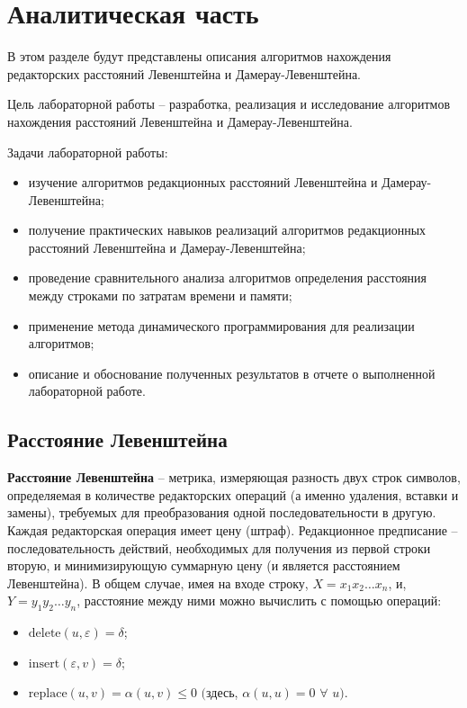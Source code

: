 \chapter{Аналитическая часть}

В этом разделе будут представлены описания алгоритмов нахождения редакторских расстояний Левенштейна и Дамерау-Левенштейна.

Цель лабораторной работы -- разработка, реализация и исследование алгоритмов нахождения расстояний Левенштейна и Дамерау-Левенштейна.

Задачи лабораторной работы:
\begin{itemize}
	\item изучение алгоритмов редакционных расстояний Левенштейна и Дамерау-Левенштейна;
    \item получение практических навыков реализаций алгоритмов редакционных расстояний Левенштейна и Дамерау-Левенштейна;
    \item проведение сравнительного анализа алгоритмов определения расстояния между строками по затратам времени и памяти;
	\item применение метода динамического программирования для реализации алгоритмов;
	\item описание и обоснование полученных результатов в отчете о выполненной лабораторной работе. 
\end{itemize}

\section{Расстояние Левенштейна}

\textbf{Расстояние Левенштейна} -- метрика, измеряющая разность двух строк символов, определяемая в количестве редакторских операций (а именно удаления, вставки и замены), требуемых для преобразования одной последовательности в другую.
Каждая редакторская операция имеет цену (штраф).
Редакционное предписание -- последовательность действий, необходимых для получения из первой строки вторую, и минимизирующую суммарную цену (и является расстоянием Левенштейна).
В общем случае, имея на входе строку, $X = x_1x_2 \dots x_n$, и, $Y = y_1y_2 \dots y_n$, расстояние между ними можно вычислить с помощью операций:

\begin{itemize}
	\item $\text{delete}(u, \varepsilon) = \delta$;
    \item $\text{insert}(\varepsilon, v) = \delta$;
    \item $\text{replace}(u, v) = \alpha(u, v) \leq 0$  $($здесь, $\alpha(u, u) = 0$ $\forall$ $u).$
\end{itemize}


